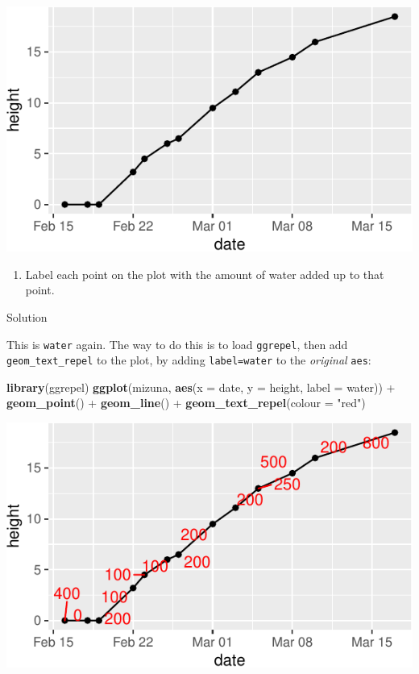 \documentclass[]{tufte-book}
\newenvironment{Shaded}{}{}
\newcommand{\DataTypeTok}[1]{\textcolor[rgb]{0.56,0.13,0.00}{#1}}
\newcommand{\KeywordTok}[1]{\textcolor[rgb]{0.00,0.44,0.13}{\textbf{#1}}}
\newcommand{\NormalTok}[1]{#1}
\newcommand{\OperatorTok}[1]{\textcolor[rgb]{0.40,0.40,0.40}{#1}}
\newcommand{\StringTok}[1]{\textcolor[rgb]{0.25,0.44,0.63}{#1}}
\providecommand{\tightlist}{%
  \setlength{\itemsep}{0pt}\setlength{\parskip}{0pt}}
\theoremstyle{definition}
\theoremstyle{definition}
\theoremstyle{definition}
\theoremstyle{remark}
\begin{document}
\includegraphics{13-dates-and-times_files/figure-latex/unnamed-chunk-13-1}

\begin{enumerate}
\def\labelenumi{(\alph{enumi})}
\setcounter{enumi}{2}
\tightlist
\item
  Label each point on the plot with the amount of water added up to that
  point.
\end{enumerate}

Solution

This is \texttt{water} again. The way to do this is to load
\texttt{ggrepel}, then add \texttt{geom\_text\_repel} to the plot, by
adding \texttt{label=water} to the \emph{original} \texttt{aes}:

\begin{Shaded}
\begin{Highlighting}[]
\KeywordTok{library}\NormalTok{(ggrepel)}
\KeywordTok{ggplot}\NormalTok{(mizuna, }\KeywordTok{aes}\NormalTok{(}\DataTypeTok{x =}\NormalTok{ date, }\DataTypeTok{y =}\NormalTok{ height, }\DataTypeTok{label =}\NormalTok{ water)) }\OperatorTok{+}\StringTok{ }
\StringTok{    }\KeywordTok{geom_point}\NormalTok{() }\OperatorTok{+}\StringTok{ }\KeywordTok{geom_line}\NormalTok{() }\OperatorTok{+}\StringTok{ }\KeywordTok{geom_text_repel}\NormalTok{(}\DataTypeTok{colour =} \StringTok{"red"}\NormalTok{)}
\end{Highlighting}
\end{Shaded}

\includegraphics{13-dates-and-times_files/figure-latex/unnamed-chunk-14-1}
\end{document}

